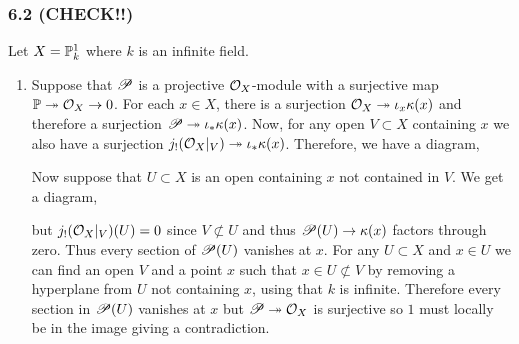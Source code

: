\documentclass[12pt]{article}
\begin{document}
\subsubsection{6.2 (CHECK!!)}

Let $X = \P^1_k$ where $k$ is an infinite field.


\begin{enumerate}
\item Suppose that $\sP$ is a projective $\struct{X}$-module with a surjective map $\P \onto \struct{X} \to 0$. For each $x \in X$, there is a surjection $\struct{X} \onto \iota_x \kappa(x)$ and therefore a surjection $\sP \onto \iota_* \kappa(x)$. Now, for any open $V \subset X$ containing $x$ we also have a surjection $j_! (\struct{X}|_V) \onto \iota_* \kappa(x)$. Therefore, we have a diagram,
\begin{center}
\end{center}
Now suppose that $U \subset X$ is an open containing $x$ not contained in $V$. We get a diagram,
\begin{center}
\end{center}
but $j_!(\struct{X}|_V)(U) = 0$ since $V \not\subset U$ and thus $\sP(U) \to \kappa(x)$ factors through zero. Thus every section of $\sP(U)$ vanishes at $x$. For any $U \subset X$ and $x \in U$ we can find an open $V$ and a point $x$ such that $x \in U \not\subset V$ by removing a hyperplane from $U$ not containing $x$, using that $k$ is infinite. Therefore every section in $\sP(U)$ vanishes at $x$ but $\sP \onto \struct{X}$ is surjective so $1$ must locally be in the image giving a contradiction.


\end{enumerate}
\end{document}
